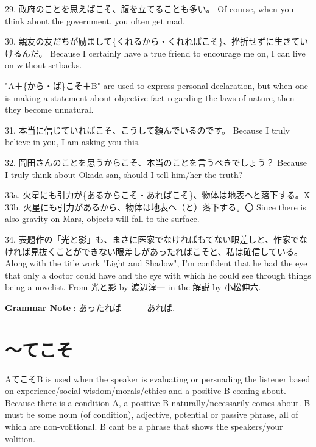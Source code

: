 \par{29. 政府のことを思えばこそ、腹を立てることも多い。 \hfill\break
Of course, when you think about the government, you often get mad. }

\par{30. 親友の友だちが励まして\{くれるから・くれればこそ\}、挫折せずに生きていけるんだ。 \hfill\break
Because I certainly have a true friend to encourage me on, I can live on without setbacks. }

\par{ "A＋\{から・ば\}こそ＋B" are used to express personal declaration, but when one is making a statement about objective fact regarding the laws of nature, then they become unnatural. }

\par{31. 本当に信じていればこそ、こうして頼んでいるのです。 \hfill\break
Because I truly believe in you, I am asking you this. }

\par{32. 岡田さんのことを思うからこそ、本当のことを言うべきでしょう？ \hfill\break
Because I truly think about Okada-san, should I tell him\slash her the truth? }

\par{33a. 火星にも引力が\{あるからこそ・あればこそ\}、物体は地表へと落下する。X \hfill\break
33b. 火星にも引力があるから、物体は地表へ（と）落下する。〇 \hfill\break
Since there is also gravity on Mars, objects will fall to the surface. }

\par{34. 表題作の「光と影」も、まさに医家でなければもてない眼差しと、作家でなければ見抜くことができない眼差しがあったればこそと、私は確信している。 \hfill\break
Along with the title work "Light and Shadow", I'm confident that he had the eye that only a doctor could have and the eye with which he could see through things being a novelist. \hfill\break
From 光と影 by 渡辺淳一 in the 解説 by 小松伸六. }

\par{\textbf{Grammar Note }: あったれば　＝　あれば. }
      
\section{～てこそ}
 
\par{ AてこそB is used when the speaker is evaluating or persuading the listener based on experience\slash social wisdom\slash morals\slash ethics and a positive B coming about. Because there is a condition A, a positive B naturally\slash necessarily comes about. B must be some noun (of condition), adjective, potential or passive phrase, all of which are non-volitional. B can\textquotesingle t be a phrase that shows the speaker\textquotesingle s\slash your volition. }

